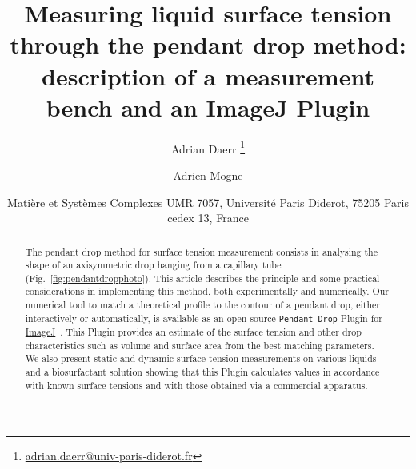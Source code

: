 \documentclass[fleqn]{scrartcl}
\newcommand{\email}[1]{\url{#1}}
\newcommand{\gouttependante}{\texttt{Pendant\_Drop}\xspace}
\begin{document}
\subject{\gouttependante}

\title{Measuring liquid surface tension through the
       pendant drop method: description of a measurement bench and an
       ImageJ Plugin}

\author{Adrian Daerr%
        \footnote{\email{adrian.daerr@univ-paris-diderot.fr}} \and
        Adrien Mogne}

\date{\scriptsize Matière et Systèmes Complexes UMR 7057,
      Université Paris Diderot, 75205 Paris cedex 13, France}

\maketitle

\begin{abstract}
  The pendant drop method for surface tension measurement consists in
  analysing the shape of an axisymmetric drop hanging from a capillary
  tube (Fig.~\ref{fig:pendantdropphoto}). This article describes the
  principle and some practical considerations in implementing this
  method, both experimentally and numerically. Our numerical tool to
  match a theoretical profile to the contour of a pendant drop, either
  interactively or automatically, is available as an open-source
  \gouttependante Plugin for
  \href{http://imagej.nih.gov/ij/}{ImageJ}~\cite{ImageJ}. This Plugin
  provides an estimate of the surface tension and other drop
  characteristics such as volume and surface area from the best
  matching parameters. We also present static and dynamic surface
  tension measurements on various liquids and a biosurfactant solution
  showing that this Plugin calculates values in accordance with known
  surface tensions and with those obtained via a commercial apparatus.
\end{abstract}
\end{document}
